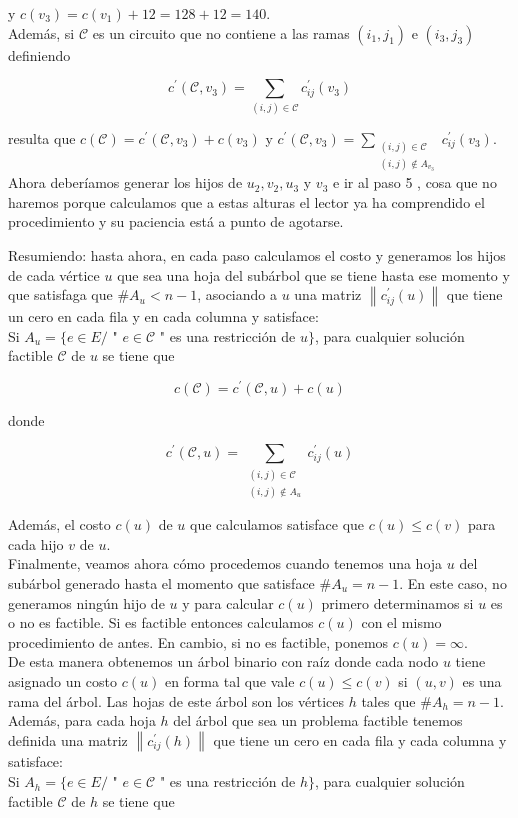\documentclass[10pt]{article}
\begin{document}
y $c\left(v_{3}\right)=c\left(v_{1}\right)+12=128+12=140$.\\
Además, si $\mathcal{C}$ es un circuito que no contiene a las ramas $\left(i_{1}, j_{1}\right)$ e $\left(i_{3}, j_{3}\right)$ definiendo

$$
c^{\prime}\left(\mathcal{C}, v_{3}\right)=\sum_{(i, j) \in \mathcal{C}} c_{i j}^{\prime}\left(v_{3}\right)
$$

resulta que $c(\mathcal{C})=c^{\prime}\left(\mathcal{C}, v_{3}\right)+c\left(v_{3}\right)$ y $c^{\prime}\left(\mathcal{C}, v_{3}\right)=\sum_{\substack{(i, j) \in \mathcal{C} \\(i, j) \notin A_{v_{3}}}} c_{i j}^{\prime}\left(v_{3}\right)$.\\
Ahora deberíamos generar los hijos de $u_{2}, v_{2}, u_{3}$ y $v_{3}$ e ir al paso 5 , cosa que no haremos porque calculamos que a estas alturas el lector ya ha comprendido el procedimiento y su paciencia está a punto de agotarse.

Resumiendo: hasta ahora, en cada paso calculamos el costo y generamos los hijos de cada vértice $u$ que sea una hoja del subárbol que se tiene hasta ese momento y que satisfaga que $\# A_{u}<n-1$, asociando a $u$ una matriz $\left\|c_{i j}^{\prime}(u)\right\|$ que tiene un cero en cada fila y en cada columna y satisface:\\
Si $A_{u}=\{e \in E /$ " $e \in \mathcal{C}$ " es una restricción de $u\}$, para cualquier solución factible $\mathcal{C}$ de $u$ se tiene que

$$
c(\mathcal{C})=c^{\prime}(\mathcal{C}, u)+c(u)
$$

donde

$$
c^{\prime}(\mathcal{C}, u)=\sum_{\substack{(i, j) \in \mathcal{C} \\(i, j) \notin A_{u}}} c_{i j}^{\prime}(u)
$$

Además, el costo $c(u)$ de $u$ que calculamos satisface que $c(u) \leq c(v)$ para cada hijo $v$ de $u$.\\
Finalmente, veamos ahora cómo procedemos cuando tenemos una hoja $u$ del subárbol generado hasta el momento que satisface $\# A_{u}=n-1$. En este caso, no generamos ningún hijo de $u$ y para calcular $c(u)$ primero determinamos si $u$ es o no es factible. Si es factible entonces calculamos $c(u)$ con el mismo procedimiento de antes. En cambio, si no es factible, ponemos $c(u)=\infty$.\\
De esta manera obtenemos un árbol binario con raíz donde cada nodo $u$ tiene asignado un costo $c(u)$ en forma tal que vale $c(u) \leq c(v)$ si $(u, v)$ es una rama del árbol. Las hojas de este árbol son los vértices $h$ tales que $\# A_{h}=n-1$. Además, para cada hoja $h$ del árbol que sea un problema factible tenemos definida una matriz $\left\|c_{i j}^{\prime}(h)\right\|$ que tiene un cero en cada fila y cada columna y satisface:\\
Si $A_{h}=\{e \in E /$ " $e \in \mathcal{C}$ " es una restricción de $h\}$, para cualquier solución factible $\mathcal{C}$ de $h$ se tiene que
\end{document}
